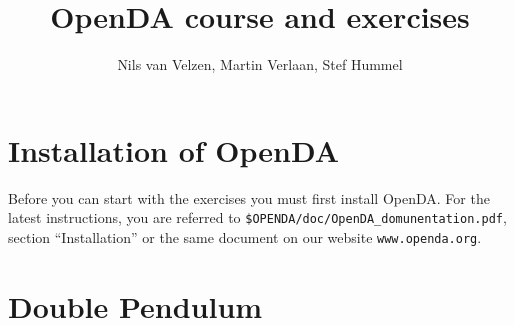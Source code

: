 \documentclass[a4paper,10pt]{article}
\title{OpenDA course and exercises}
\author{Nils van Velzen, Martin Verlaan, Stef Hummel}
\begin{document}

\maketitle



\section*{Installation of OpenDA}
Before you can start with the exercises you must first install OpenDA. For the
latest instructions, you are referred to \verb|$OPENDA/doc/OpenDA_domunentation.pdf|, 
section ``Installation'' or the same document on our website \verb|www.openda.org|.

\section{Double Pendulum}

\end{document}
